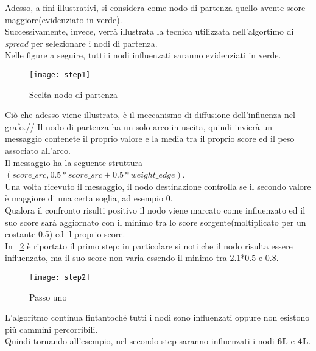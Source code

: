 \clearpage

Adesso, a fini illustrativi, si considera come nodo di partenza quello avente
score maggiore(evidenziato in verde).\\
Successivamente, invece, verrà illustrata la tecnica utilizzata nell'algortimo di \textit{spread}
per selezionare i nodi di partenza.\\
Nelle figure a seguire, tutti i nodi influenzati saranno evidenziati in verde.
\begin{figure}[!htbp]
  \begin{center}
    \texttt{[image: step1]}
  	\caption{Scelta nodo di partenza}
  	\label{step1}
  \end{center}
\end{figure}
\clearpage
Ciò che adesso viene illustrato, è il meccanismo di diffusione dell'influenza nel
grafo.//
Il nodo di partenza ha un solo arco in uscita, quindi invierà un messaggio contenete il proprio valore e
la media tra il proprio score ed il peso associato all'arco.\\
Il messaggio ha la seguente struttura $(score\_src, 0.5*score\_src+0.5*weight\_edge)$.\\
Una volta ricevuto il messaggio, il nodo destinazione controlla se il secondo valore è maggiore di una certa soglia,
ad esempio 0.\\
Qualora il confronto risulti positivo il nodo viene marcato come influenzato ed il
suo score sarà aggiornato con il minimo tra lo score sorgente(moltiplicato per un costante 0.5) ed il proprio score.\\
In \figurename~\ref{step2} è riportato il primo step: in particolare si noti che il nodo
risulta essere influenzato, ma il suo score non varia essendo il minimo tra 2.1*0.5 e 0.8.

\begin{figure}[!htbp]
  \begin{center}
    \texttt{[image: step2]}
  	\caption{Passo uno}
  	\label{step2}
  \end{center}
\end{figure}
\clearpage
L'algoritmo continua fintantoché tutti i nodi sono influenzati oppure non esistono più cammini percorribili.\\
Quindi tornando all'esempio, nel secondo step saranno influenzati i nodi \textbf{6L} e \textbf{4L}.

